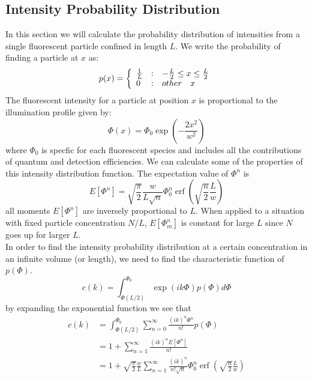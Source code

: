 \documentclass[%
 reprint,
 amsmath,amssymb,
 aps,
]{revtex4-1}
\DeclareMathOperator\erf{erf}
\begin{document}
\subsection{Intensity Probability Distribution}
In this section we will calculate the probability distribution of intensities from a single fluorescent particle confined in length $L$.  We write the probability of finding a particle at $x$ as:
\begin{equation}
	p(x) = \left\{
		\begin{array}{l@{\quad : \quad}l}
			\frac{1}{L} & -\frac{L}{2} \le x \le \frac{L}{2} \\
			0 & other \quad x
		\end{array}
	\right.
\end{equation}
The fluorescent intensity for a particle at position $x$ is proportional to the illumination profile given by:
\begin{equation}
	\Phi(x) = \Phi_{0}\exp{\left(-\frac{2x^{2}}{w^2}\right)}
\end{equation}
where $\Phi_{0}$ is specfic for each fluorescent species and includes all the contributions of quantum and detection efficiencies.  
We can calculate some of the properties of this intensity distribution function.  The expectation value of $\Phi^{n}$ is
\begin{equation}
	E[\Phi^{n}] = \sqrt{\frac{\pi}{2}}\frac{w}{L\sqrt{n}}\Phi_{0}^{n} \erf{\left(\sqrt{\frac{n}{2}}\frac{L}{w}\right)}
\end{equation}
all moments $E[\Phi^{n}]$ are inversely proportional to $L$.  When applied to a situation with fixed particle concentration $N/L$, $E[\Phi_{m}^{n}]$ is constant for large $L$ since $N$ goes up for larger $L$.\\
In order to find the intensity probability distribution at a certain concentration in an infinite volume (or length), we need to find the characteristic function of $p(\Phi)$.
\begin{equation}
	c(k) = \int_{\Phi(L/2)}^{\Phi_{0}}\exp(ik\Phi)p(\Phi)d\Phi
\end{equation}
by expanding the exponential function we see that
\begin{equation}
	\begin{aligned}
	c(k) &= \int_{\Phi(L/2)}^{\Phi_{0}}\sum_{n=0}^{\infty}\frac{(ik)^{n}\Phi^{n}}{n!}p(\Phi)\\
	&=1+\sum_{n=1}^{\infty}\frac{(ik)^{n}E[\Phi^{n}]}{n!}\\
	&=1+\sqrt{\frac{\pi}{2}}\frac{w}{L}\sum_{n=1}^{\infty}\frac{(ik)^{n}}{n!\sqrt{n}}\Phi_{0}^{n} \erf{\left(\sqrt{\frac{n}{2}}\frac{L}{w}\right)}
	\end{aligned}
\end{equation}
\end{document}
